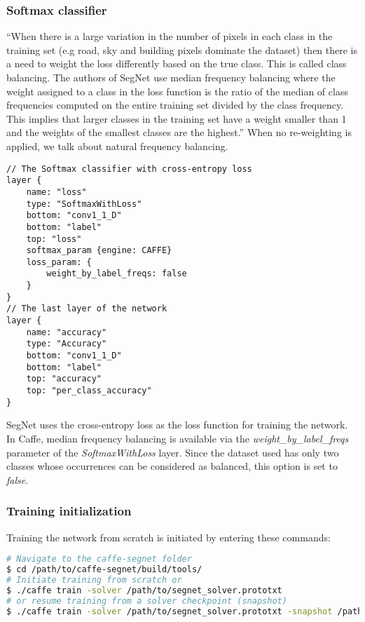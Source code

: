 \newpage
\subsubsection{Softmax classifier}

\enquote{When there is a large variation in the number of pixels in each class in the training set (e.g road, sky and building pixels dominate the dataset) then there is a need to weight the loss differently based on the true class. This is called class balancing. The authors of SegNet use median frequency balancing where the weight assigned to a class in the loss function is the ratio of the median of class frequencies computed on the entire training set divided by the class frequency. This implies that larger classes in the training set have a weight smaller than 1 and the weights of the smallest classes are the highest.} \cite{segnet} When no re-weighting is applied, we talk about natural frequency balancing.

\begin{lstlisting}[caption={Output layers of \textit{train.prototxt}},captionpos=b]
// The Softmax classifier with cross-entropy loss
layer {
	name: "loss"
	type: "SoftmaxWithLoss"
	bottom: "conv1_1_D"
	bottom: "label"
	top: "loss"
	softmax_param {engine: CAFFE}
	loss_param: {
		weight_by_label_freqs: false	     
	}
}
// The last layer of the network
layer {
	name: "accuracy"
	type: "Accuracy"
	bottom: "conv1_1_D"
	bottom: "label"
	top: "accuracy"
	top: "per_class_accuracy"
}
\end{lstlisting}


SegNet uses the cross-entropy loss as the loss function for training the network. In Caffe, median frequency balancing is available via the \textit{weight\_by\_label\_freqs} parameter of the \textit{SoftmaxWithLoss} layer. Since the dataset used has only two classes whose occurrences can be considered as balanced, this option is set to \textit{false}. 

\subsubsection{Training initialization}

\noindent Training the network from scratch is initiated by entering these commands:

\begin{lstlisting}[language=bash]
# Navigate to the caffe-segnet folder
$ cd /path/to/caffe-segnet/build/tools/
# Initiate training from scratch or
$ ./caffe train -solver /path/to/segnet_solver.prototxt
# or resume training from a solver checkpoint (snapshot)
$ ./caffe train -solver /path/to/segnet_solver.prototxt -snapshot /path/to/snapshot_iter_XY.solverstate
\end{lstlisting}

